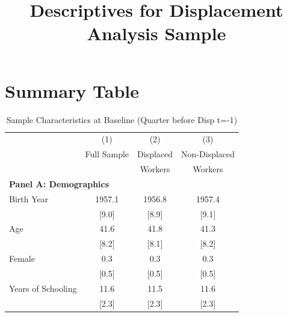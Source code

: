 \documentclass{article}
\begin{document}
\title{Descriptives for Displacement Analysis Sample}
\maketitle
\section{Summary Table}
\begin{table}[p] \centering 
\begin{threeparttable} 
\caption{Sample Characteristics at Baseline (Quarter before Disp t=-1)}    
\begin{tabular}{l *{3}{c}} 
\toprule
                                                        & (1)                 &    (2)              &    (3)              \\
                                                        & Full Sample         &    Displaced        &    Non-Displaced    \\
                                                        &                     &    Workers          &    Workers          \\
\midrule
 \multicolumn{4}{l}{\textbf{Panel A: Demographics}} \\ 
Birth Year                                              &              1957.1 &              1956.8 &              1957.4 \\ 
                                                        &               [9.0] &               [8.9] &               [9.1] \\ 
Age                                                     &                41.6 &                41.8 &                41.3 \\ 
                                                        &               [8.2] &               [8.1] &               [8.2] \\ 
Female                                                  &                 0.3 &                 0.3 &                 0.3 \\ 
                                                        &               [0.5] &               [0.5] &               [0.5] \\ 
Years of Schooling                                      &                11.6 &                11.5 &                11.6 \\ 
                                                        &               [2.3] &               [2.3] &               [2.3] \\ 

\end{tabular}
\end{threeparttable}
\end{table}
\end{document}
